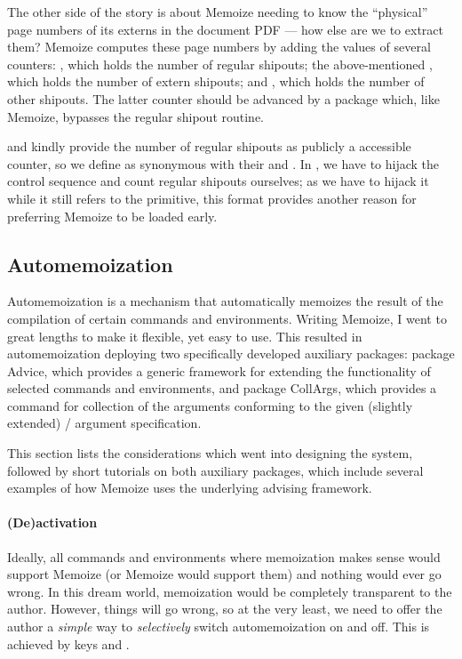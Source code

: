\documentclass[a4paper,11pt]{article}
\begin{document}
The other side of the story is about Memoize needing to know the ``physical''
page numbers of its externs in the document PDF --- how else are we to extract
them?  Memoize computes these page numbers by adding the values of several
counters: , which holds the number of regular shipouts;
the above-mentioned , which holds the number of extern
shipouts; and , which holds the number of other shipouts.
The latter counter should be advanced by a package which, like Memoize,
bypasses the regular shipout routine.

 and  kindly provide the number of regular
shipouts as publicly a accessible counter, so we define
 as synonymous with their
 and .  In , we
have to hijack the  control sequence and count regular shipouts
ourselves; as we have to hijack it while it still refers to the
 primitive, this format provides another reason for preferring
Memoize to be loaded early.


\subsection{Automemoization}
\label{sec:tut:automemoization-details}

Automemoization is a mechanism that automatically memoizes the result of the
compilation of certain commands and environments.  Writing Memoize, I went to
great lengths to make it flexible, yet easy to use.  This resulted in
automemoization deploying two specifically developed auxiliary packages:
package Advice, which provides a generic framework for extending the
functionality of selected commands and environments, and package CollArgs,
which provides a command for collection of the arguments conforming to the
given (slightly extended) \slash {} argument
specification.

This section lists the considerations which went into designing the system,
followed by short tutorials on both auxiliary packages, which include several
examples of how Memoize uses the underlying advising framework.

\paragraph{(De)activation}
Ideally, all commands and environments where memoization makes sense would
support Memoize (or Memoize would support them) and nothing would ever go
wrong.  In this dream world, memoization would be completely transparent to the
author.  However, things will go wrong, so at the very least, we need to
offer the author a \emph{simple} way to \emph{selectively} switch automemoization
on and off.  This is achieved by keys  and
.
\end{document}
